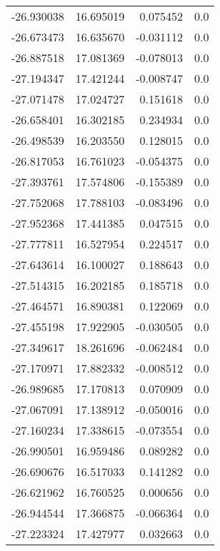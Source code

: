 \begin{tabular}{rrrr}
      -26.930038 &        16.695019 &    0.075452 &   0.0 \\
      -26.673473 &        16.635670 &   -0.031112 &   0.0 \\
      -26.887518 &        17.081369 &   -0.078013 &   0.0 \\
      -27.194347 &        17.421244 &   -0.008747 &   0.0 \\
      -27.071478 &        17.024727 &    0.151618 &   0.0 \\
      -26.658401 &        16.302185 &    0.234934 &   0.0 \\
      -26.498539 &        16.203550 &    0.128015 &   0.0 \\
      -26.817053 &        16.761023 &   -0.054375 &   0.0 \\
      -27.393761 &        17.574806 &   -0.155389 &   0.0 \\
      -27.752068 &        17.788103 &   -0.083496 &   0.0 \\
      -27.952368 &        17.441385 &    0.047515 &   0.0 \\
      -27.777811 &        16.527954 &    0.224517 &   0.0 \\
      -27.643614 &        16.100027 &    0.188643 &   0.0 \\
      -27.514315 &        16.202185 &    0.185718 &   0.0 \\
      -27.464571 &        16.890381 &    0.122069 &   0.0 \\
      -27.455198 &        17.922905 &   -0.030505 &   0.0 \\
      -27.349617 &        18.261696 &   -0.062484 &   0.0 \\
      -27.170971 &        17.882332 &   -0.008512 &   0.0 \\
      -26.989685 &        17.170813 &    0.070909 &   0.0 \\
      -27.067091 &        17.138912 &   -0.050016 &   0.0 \\
      -27.160234 &        17.338615 &   -0.073554 &   0.0 \\
      -26.990501 &        16.959486 &    0.089282 &   0.0 \\
      -26.690676 &        16.517033 &    0.141282 &   0.0 \\
      -26.621962 &        16.760525 &    0.000656 &   0.0 \\
      -26.944544 &        17.366875 &   -0.066364 &   0.0 \\
      -27.223324 &        17.427977 &    0.032663 &   0.0 \\

\end{tabular}
